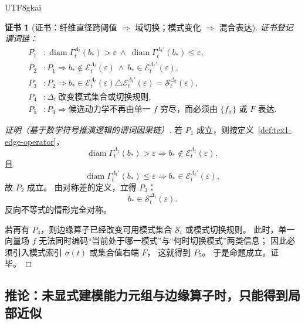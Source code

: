 \documentclass[12pt]{article}
\newtheorem{Certificate}{证书}[section]
\newcommand{\diameter}{\operatorname{diam}}
\begin{document}
\begin{CJK*}{UTF8}{gkai}
\begin{Certificate}[证书：纤维直径跨阈值 $\Rightarrow$ 域切换；模式变化 $\Rightarrow$ 混合表达]
\label{cert:tex1-edge-phase}
证书登记谓词链：
\[
\begin{aligned}
  P_1 &: \diameter\Gamma_t^{\Lambda_t}(b_\ast)>\varepsilon
        \ \wedge\
        \diameter\Gamma_t^{\Lambda_t'}(b_\ast)\le \varepsilon,\\
  P_2 &: P_1\Rightarrow
        b_\ast\notin \mathcal E_t^{\Lambda_t}(\varepsilon)
        \ \wedge\
        b_\ast\in \mathcal E_t^{\Lambda_t'}(\varepsilon),\\
  P_3 &: P_2\Rightarrow
        b_\ast\in
        \mathcal E_t^{\Lambda_t}(\varepsilon)
        \triangle
        \mathcal E_t^{\Lambda_t'}(\varepsilon)
        =
        \mathcal S_t^{\Delta_t}(\varepsilon),\\
  P_4 &: \Delta_t\ \text{改变模式集合或切换规则},\\
  P_5 &: P_4\Rightarrow
        \text{候选动力学不再由单一 }f\text{ 穷尽，而必须由 } \{f_\sigma\}\text{ 或 }F\text{ 表达}.
\end{aligned}
\]
\end{Certificate}

\begin{proof}[证明（基于数学符号推演逻辑的谓词因果链）]
若 \(P_1\) 成立，则按定义~\ref{def:tex1-edge-operator}，
\[
  \diameter\Gamma_t^{\Lambda_t}(b_\ast)>\varepsilon
  \Rightarrow
  b_\ast\notin \mathcal E_t^{\Lambda_t}(\varepsilon),
\]
且
\[
  \diameter\Gamma_t^{\Lambda_t'}(b_\ast)\le \varepsilon
  \Rightarrow
  b_\ast\in \mathcal E_t^{\Lambda_t'}(\varepsilon),
\]
故 \(P_2\) 成立。
由对称差的定义，立得 \(P_3\)：
\[
  b_\ast\in \mathcal S_t^{\Delta_t}(\varepsilon).
\]
反向不等式的情形完全对称。

若再有 \(P_4\)，则边缘算子已经改变可用模式集合 $\mathcal S_t$ 或模式切换规则。
此时，单一向量场 $f$ 无法同时编码“当前处于哪一模式”与“何时切换模式”两类信息；
因此必须引入模式索引 $\sigma(t)$ 或集合值右端 $F$，
这就得到 \(P_5\)。
于是命题成立。证毕。
\end{proof}

\subsection{推论：未显式建模能力元组与边缘算子时，只能得到局部近似}
\label{subsec:tex1-ch1-corollary}


\end{CJK*}
\end{document}
